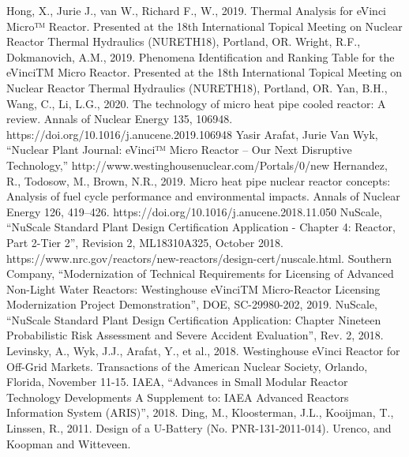 \documentclass[10pt,a4paper]{article}
\begin{document}
\begin{thebibliography}{X}
 Hong, X., Jurie J.,  van W., Richard F., W., 2019. Thermal Analysis for eVinci Micro™ Reactor. Presented at the 18th International Topical Meeting on Nuclear Reactor Thermal Hydraulics (NURETH18), Portland, OR.
 Wright, R.F., Dokmanovich, A.M., 2019. Phenomena Identification and Ranking Table for the eVinciTM Micro Reactor. Presented at the 18th International Topical Meeting on Nuclear Reactor Thermal Hydraulics (NURETH18), Portland, OR.
 Yan, B.H., Wang, C., Li, L.G., 2020. The technology of micro heat pipe cooled reactor: A review. Annals of Nuclear Energy 135, 106948. https://doi.org/10.1016/j.anucene.2019.106948
 Yasir Arafat, Jurie Van Wyk, “Nuclear Plant Journal: eVinci™ Micro Reactor – Our Next Disruptive Technology,” http://www.westinghousenuclear.com/Portals/0/new%
 Hernandez, R., Todosow, M., Brown, N.R., 2019. Micro heat pipe nuclear reactor concepts: Analysis of fuel cycle performance and environmental impacts. Annals of Nuclear Energy 126, 419–426. https://doi.org/10.1016/j.anucene.2018.11.050
 NuScale, “NuScale Standard Plant Design Certification Application - Chapter 4: Reactor, Part 2-Tier 2”, Revision 2, ML18310A325, October 2018. https://www.nrc.gov/reactors/new-reactors/design-cert/nuscale.html. 
 Southern Company, “Modernization of Technical Requirements for Licensing of Advanced Non-Light Water Reactors: Westinghouse eVinciTM Micro-Reactor Licensing Modernization Project Demonstration”, DOE, SC-29980-202, 2019.
 NuScale, “NuScale Standard Plant Design Certification Application: Chapter Nineteen Probabilistic Risk Assessment and Severe Accident Evaluation”, Rev. 2, 2018. 
 Levinsky, A., Wyk, J.J., Arafat, Y., et al., 2018. Westinghouse eVinci Reactor for Off-Grid Markets. Transactions of the American Nuclear Society, Orlando, Florida, November 11-15.
 IAEA, “Advances in Small Modular Reactor Technology Developments A Supplement to: IAEA Advanced Reactors Information System (ARIS)”, 2018. 
Ding, M., Kloosterman, J.L., Kooijman, T., Linssen, R., 2011. Design of a U-Battery (No. PNR-131-2011-014). Urenco, and Koopman and Witteveen.



\end{thebibliography}
\end{document}

